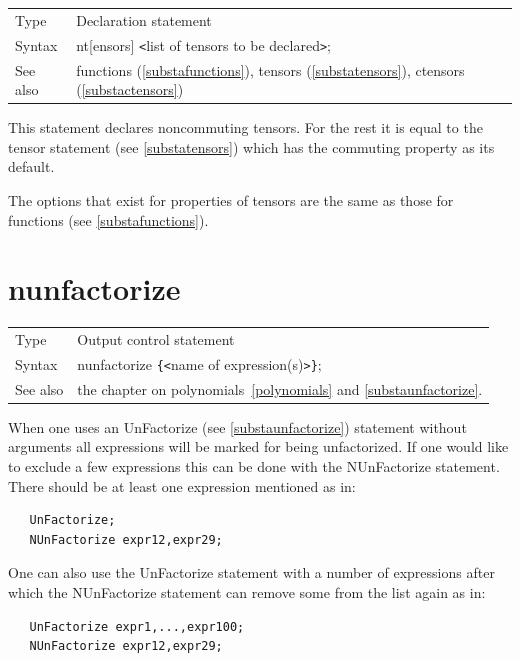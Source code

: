 \noindent \begin{tabular}{ll}
Type & Declaration statement\\
Syntax & nt[ensors] {\tt<}list of tensors to be declared{\tt>}; \\
See also & functions (\ref{substafunctions}), tensors 
            (\ref{substatensors}), ctensors (\ref{substactensors})
\end{tabular} \vspace{4mm}

\noindent This statement declares 
noncommuting tensors. For 
the rest it is equal to the tensor statement (see 
\ref{substatensors}) which has the commuting property as its default.

\noindent The options that exist for properties of tensors are the same as 
those for functions (see \ref{substafunctions}). \vspace{10mm}


\section{nunfactorize}
\label{substanunfactorize}

\noindent \begin{tabular}{ll}
Type & Output control statement\\
Syntax & nunfactorize \verb:{:{\tt<}name of expression(s){\tt>}\verb:}:;
\\ See also & the chapter on polynomials~\ref{polynomials} and 
\ref{substaunfactorize}.
\end{tabular} \vspace{4mm}

\noindent When one uses an UnFactorize (see \ref{substaunfactorize}) 
statement without arguments all expressions will be marked for being 
unfactorized. If one would like to exclude a few expressions this can be 
done with the NUnFactorize statement. There should be at least one expression 
mentioned as in:
\begin{verbatim}
   UnFactorize;
   NUnFactorize expr12,expr29;
\end{verbatim}
One can also use the UnFactorize statement with a number of expressions after 
which the NUnFactorize statement can remove some from the list again as in:
\begin{verbatim}
   UnFactorize expr1,...,expr100;
   NUnFactorize expr12,expr29;
\end{verbatim}

